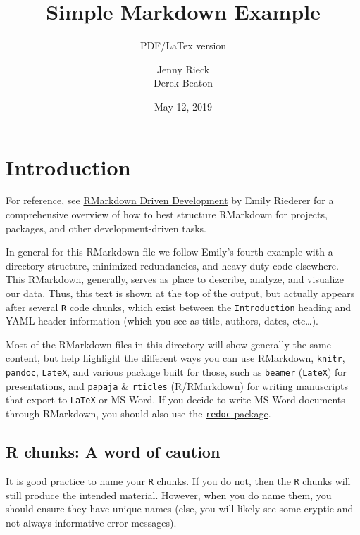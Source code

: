 \documentclass[]{article}
\title{Simple Markdown Example}
\subtitle{PDF/LaTex version}
\author{Jenny Rieck \\ Derek Beaton}
\date{May 12, 2019}
\begin{document}
\maketitle

\hypertarget{introduction}{%
\section{Introduction}\label{introduction}}

For reference, see
\href{https://emilyriederer.netlify.com/post/rmarkdown-driven-development/}{RMarkdown
Driven Development} by Emily Riederer for a comprehensive overview of
how to best structure RMarkdown for projects, packages, and other
development-driven tasks.

In general for this RMarkdown file we follow Emily's fourth example with
a directory structure, minimized redundancies, and heavy-duty code
elsewhere. This RMarkdown, generally, serves as place to describe,
analyze, and visualize our data. Thus, this text is shown at the top of
the output, but actually appears after several \texttt{R} code chunks,
which exist between the \texttt{Introduction} heading and YAML header
information (which you see as title, authors, dates, etc\ldots{}).

Most of the RMarkdown files in this directory will show generally the
same content, but help highlight the different ways you can use
RMarkdown, \texttt{knitr}, \texttt{pandoc}, \texttt{LateX}, and various
package built for those, such as \texttt{beamer} (\texttt{LateX}) for
presentations, and
\href{https://github.com/crsh/papaja}{\texttt{papaja}} \&
\href{https://github.com/rstudio/rticles}{\texttt{rticles}}
(R/RMarkdown) for writing manuscripts that export to \texttt{LaTeX} or
MS Word. If you decide to write MS Word documents through RMarkdown, you
should also use the
\href{https://github.com/noamross/redoc}{\texttt{redoc} package}.

\hypertarget{r-chunks-a-word-of-caution}{%
\subsection{R chunks: A word of
caution}\label{r-chunks-a-word-of-caution}}

It is good practice to name your \texttt{R} chunks. If you do not, then
the \texttt{R} chunks will still produce the intended material. However,
when you do name them, you should ensure they have unique names (else,
you will likely see some cryptic and not always informative error
messages).
\end{document}
